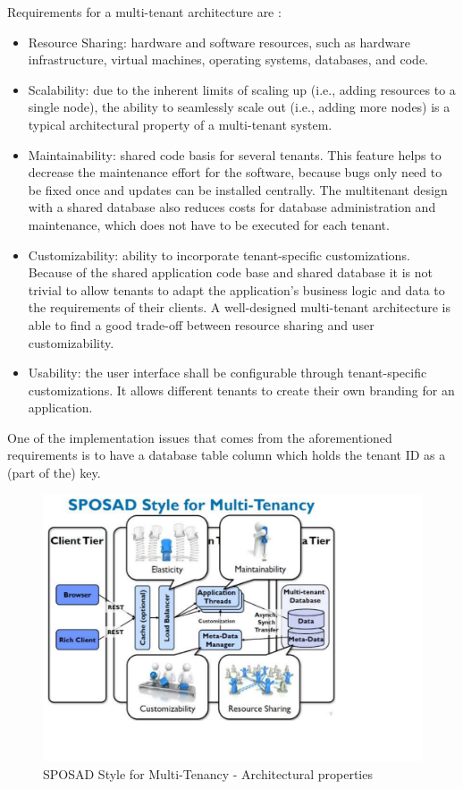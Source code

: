 Requirements for a multi-tenant architecture are \cite{Koziolek10}:
\begin{itemize}
	\item Resource Sharing: hardware and software resources, such
as hardware infrastructure, virtual machines, operating systems, databases, and code.
	\item Scalability: due to the inherent limits of scaling up (i.e., adding resources to a single node), the ability to seamlessly scale out (i.e., adding more nodes) is a typical architectural property of a multi-tenant system.
	\item Maintainability: shared code basis for several tenants. This feature helps to decrease the maintenance effort for the software,
because bugs only need to be fixed once and updates can be installed centrally. The multitenant design with a shared database also reduces costs for database administration and maintenance, which does not have to be executed for each tenant.
	\item Customizability: ability to incorporate tenant-specific customizations. Because of the shared application code base
and shared database it is not trivial to allow tenants to adapt the application's business logic and data to the requirements of their clients. A well-designed multi-tenant architecture is able to find a good trade-off between resource sharing and user customizability.
	\item Usability: the user interface shall be configurable through tenant-specific customizations. It allows different tenants to create their own branding for an application.
\end{itemize}

One of the implementation issues that comes from the aforementioned requirements is to have a database table column which holds the tenant ID as a (part of the) key.

\begin{figure}[h]
\centering
\includegraphics{patterns/Multi-tenantApplicationDiagram-02.pdf}
\caption{SPOSAD Style for Multi-Tenancy - Architectural properties}
\label{fig:Multi-tenantApplicationDiagram-02}
\end{figure}

